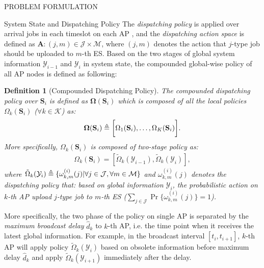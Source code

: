 \documentclass[10pt, conference, letterpaper]{IEEEtran}
\newtheorem{definition}{Definition}
\newcommand{\define}{\triangleq}
\renewcommand{\vec}{\mathbf}
\DeclarePairedDelimiter{\set}{\{}{\}}
\DeclarePairedDelimiter{\Bracket}{\bigg[}{\bigg]}
\newcommand{\apSet}{\mathcal{K}}
\newcommand{\esSet}{\mathcal{M}}
\newcommand{\jSpace}{\mathcal{J}}
\newcommand{\Stat}{\mathbf{S}}
\newcommand{\Obsv}{\mathcal{Y}}
\newcommand{\Policy}{\mathbf{\Omega}}
\begin{document}
\begin{section}{PROBLEM FORMULATION}
\begin{subsection}{System State and Dispatching Policy}
            The \emph{dispatching policy} is applied over arrival jobs in each timeslot on each AP
            , and the \emph{dispatching action space} is defined as $\vec{A}: (j, m) \in \jSpace \times \esSet$, where $(j, m)$ denotes the action that $j$-type job should be uploaded to $m$-th ES.
            Based on the two stages of global system information $\Obsv_{i-1}$ and $\Obsv_{i}$ in system state, the compounded global-wise policy of all AP nodes is defined as following:
            \begin{definition}[Compounded Dispatching Policy]
                The compounded dispatching policy over $\Stat_{i}$ is defined as $\Policy(\Stat_{i})$ which is composed of all the local policies $\Omega_k(\Stat_{i})$ ($\forall k\in\apSet$) as:
                \begin{align}
                    \vec{\Omega}(\Stat_{i}) \define \Bracket{\Omega_1(\Stat_{i}), \dots, \Omega_K(\Stat_{i})}.
                \end{align}
                More specifically, $\Omega_k(\Stat_{i})$ is composed of two-stage policy as:
                \begin{align}
                    \Omega_k(\Stat_i) = [\tilde{\Omega}_k(\Obsv_{i-1}), \tilde{\Omega}_k(\Obsv_{i})],
                \end{align}
                where $\tilde{\Omega}_k(\Obsv_{i}) \define \set{\omega^{(i)}_{k,m}(j)|\forall j\in\jSpace, \forall m\in\esSet}$ and $\omega^{(i)}_{k,m}(j)$ denotes the dispatching policy that: based on global information $\Obsv_{i}$, the probabilistic action on $k$-th AP upload $j$-type job to $m$-th ES ($\sum_{j\in\jSpace} \Pr\{\omega^{(i)}_{k,m}(j)\}=1$).
            \end{definition}
            More specifically, the two phase of the policy on single AP is separated by the \emph{maximum broadcast delay} $\hat{d}_k$ to $k$-th AP, i.e. the time point when it receives the latest global information. For example, in the broadcast interval $[t_{i}, t_{i+1}]$, $k$-th AP will apply policy $\tilde{\Omega}_k(\Obsv_{i})$ based on obsolete information before maximum delay $\hat{d}_k$ and apply $\tilde{\Omega}_k(\Obsv_{i+1})$ immediately after the delay.
        \end{subsection}


\end{section}
\end{document}
